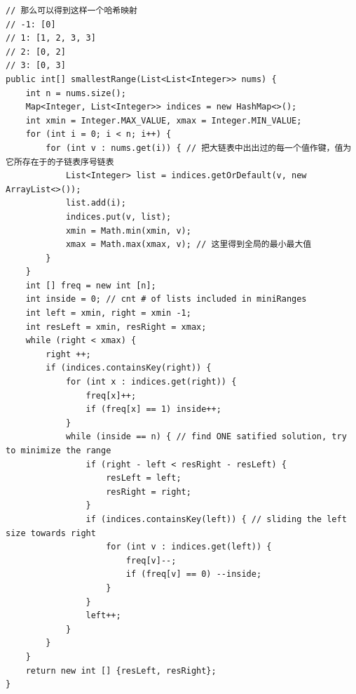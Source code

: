 \documentclass[9pt, b5paper]{article}
\begin{document}
\begin{verbatim}
// 那么可以得到这样一个哈希映射
// -1: [0]
// 1: [1, 2, 3, 3]
// 2: [0, 2]
// 3: [0, 3]
public int[] smallestRange(List<List<Integer>> nums) {
    int n = nums.size();
    Map<Integer, List<Integer>> indices = new HashMap<>();
    int xmin = Integer.MAX_VALUE, xmax = Integer.MIN_VALUE;
    for (int i = 0; i < n; i++) {
        for (int v : nums.get(i)) { // 把大链表中出出过的每一个值作键，值为它所存在于的子链表序号链表
            List<Integer> list = indices.getOrDefault(v, new ArrayList<>());
            list.add(i);
            indices.put(v, list);
            xmin = Math.min(xmin, v);
            xmax = Math.max(xmax, v); // 这里得到全局的最小最大值
        }
    }
    int [] freq = new int [n];
    int inside = 0; // cnt # of lists included in miniRanges
    int left = xmin, right = xmin -1;
    int resLeft = xmin, resRight = xmax;
    while (right < xmax) {
        right ++;
        if (indices.containsKey(right)) {
            for (int x : indices.get(right)) {
                freq[x]++;
                if (freq[x] == 1) inside++;
            }
            while (inside == n) { // find ONE satified solution, try to minimize the range
                if (right - left < resRight - resLeft) {
                    resLeft = left;
                    resRight = right;
                }
                if (indices.containsKey(left)) { // sliding the left size towards right
                    for (int v : indices.get(left)) {
                        freq[v]--;
                        if (freq[v] == 0) --inside;
                    }
                }
                left++;
            }
        }
    }
    return new int [] {resLeft, resRight};
}
\end{verbatim}
\end{document}
